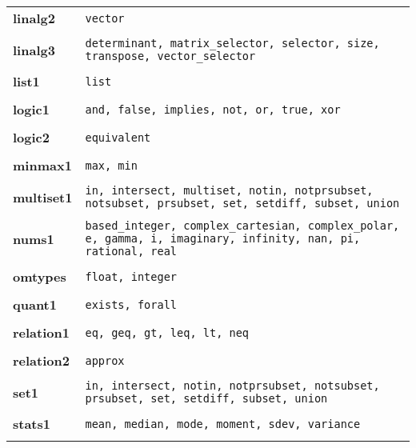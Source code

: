 \begin{tabular}{p{2in} p{2in}}


{\bf linalg2 }& {\tt vector}\\ \\


{\bf linalg3 }& {\tt determinant, matrix\_selector, selector, size, transpose, vector\_selector}\\ \\

{\bf list1 }& {\tt list}\\ \\


{\bf logic1 }& {\tt and, false, implies, not, or, true, xor}\\ \\


{\bf logic2 }& {\tt equivalent}\\ \\


{\bf minmax1 }& {\tt max, min}\\ \\


{\bf multiset1 }& {\tt in, intersect, multiset, notin, notprsubset, notsubset, prsubset, set, setdiff, subset, union}\\ \\

{\bf nums1 }& {\tt based\_integer, complex\_cartesian, complex\_polar, e, gamma, i, imaginary, infinity, nan, pi, rational,
real}\\ \\


{\bf omtypes }& {\tt float, integer}\\ \\


{\bf quant1 }& {\tt exists, forall}\\ \\


{\bf relation1 }& {\tt eq, geq, gt, leq, lt, neq}\\ \\


{\bf relation2 }& {\tt approx}\\ \\


{\bf set1 }& {\tt in, intersect, notin, notprsubset, notsubset, prsubset, set, setdiff, subset, union}\\ \\


{\bf stats1 }& {\tt mean, median, mode, moment, sdev, variance}\\ \\

\end{tabular}


